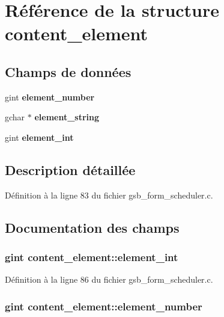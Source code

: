 \section{Référence de la structure content\_\-element}
\label{structcontent__element}
\subsection*{Champs de données}
\begin{DoxyCompactItemize}
\item 
gint {\bf element\_\-number}
\item 
gchar $\ast$ {\bf element\_\-string}
\item 
gint {\bf element\_\-int}
\end{DoxyCompactItemize}


\subsection{Description détaillée}


Définition à la ligne 83 du fichier gsb\_\-form\_\-scheduler.c.



\subsection{Documentation des champs}
\subsubsection[{element\_\-int}]{\setlength{\rightskip}{0pt plus 5cm}gint {\bf content\_\-element::element\_\-int}}\label{structcontent__element_aba3dfed5bba7d03a3f36d6259d6ac1ec}


Définition à la ligne 86 du fichier gsb\_\-form\_\-scheduler.c.

\subsubsection[{element\_\-number}]{\setlength{\rightskip}{0pt plus 5cm}gint {\bf content\_\-element::element\_\-number}}\label{structcontent__element_a7e6208a73b9cbfcca73b149f04c9e6a1}


